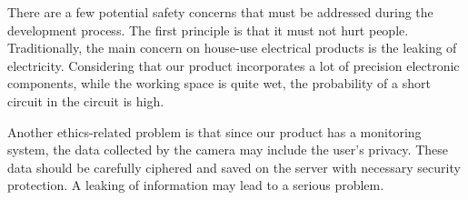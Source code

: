 There are a few potential safety concerns that must be addressed during the development process. The first principle is that it must not hurt people. Traditionally, the main concern on house-use electrical products is the leaking of electricity. Considering that our product incorporates a lot of precision electronic components, while the working space is quite wet, the probability of a short circuit in the circuit is high. 

Another ethics-related problem is that since our product has a monitoring system, the data collected by the camera may include the user's privacy. These data should be carefully ciphered and saved on the server with necessary security protection. A leaking of information may lead to a serious problem.